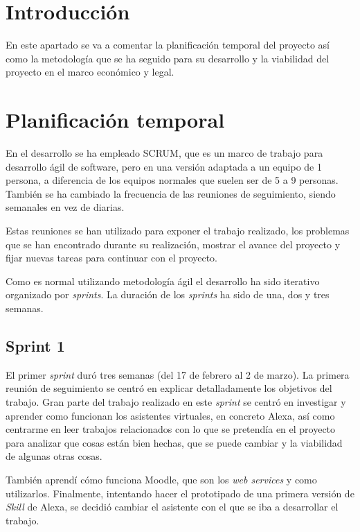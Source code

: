 
\section{Introducción}

En este apartado se va a comentar la planificación temporal del proyecto así como la metodología que se ha seguido para su desarrollo y la viabilidad del proyecto en el marco económico y legal.

\section{Planificación temporal}

En el desarrollo se ha empleado SCRUM, que es un marco de trabajo para desarrollo ágil de software, pero en una versión adaptada a un equipo de 1 persona, a diferencia de los equipos normales que suelen ser de 5 a 9 personas. También se ha cambiado la frecuencia de las reuniones de seguimiento, siendo semanales en vez de diarias.

Estas reuniones se han utilizado para exponer el trabajo realizado, los problemas que se han encontrado durante su realización, mostrar el avance del proyecto y fijar nuevas tareas para continuar con el proyecto.

Como es normal utilizando metodología ágil el desarrollo ha sido iterativo organizado por \textit{sprints}. La duración de los \textit{sprints} ha sido de una, dos y tres semanas.

\subsection{Sprint 1}

El primer \textit{sprint} duró tres semanas (del 17 de febrero al 2 de marzo). La primera reunión de seguimiento se centró en explicar detalladamente los objetivos del trabajo. Gran parte del trabajo realizado en este \textit{sprint} se centró en investigar y aprender como funcionan los asistentes virtuales, en concreto Alexa, así como centrarme en leer trabajos relacionados con lo que se pretendía en el proyecto para analizar que cosas están bien hechas, que se puede cambiar y la viabilidad de algunas otras cosas.

También aprendí cómo funciona Moodle, que son los \textit{web services} y como utilizarlos. Finalmente, intentando hacer el prototipado de una primera versión de \textit{Skill} de Alexa, se decidió cambiar el asistente con el que se iba a desarrollar el trabajo.

